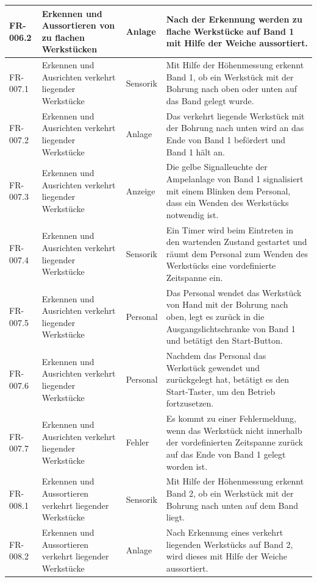\documentclass[oneside,a4paper,titlepage]{scrartcl} %
\begin{document}
\begin{small}
\begin{longtable}{|C{2cm}|L{4cm}|C{1.5cm}|L{5.5cm}|}
  \hline
   FR-006.2 & Erkennen und Aussortieren von zu flachen Werkstücken & Anlage & Nach der Erkennung werden zu flache Werkstücke auf Band 1 mit Hilfe der Weiche aussortiert.\\
  \hline
  FR-007.1 & Erkennen und Ausrichten verkehrt liegender Werkstücke & Sensorik & Mit Hilfe der Höhenmessung erkennt Band 1, ob ein Werkstück mit der Bohrung nach oben oder unten auf das Band gelegt wurde.\\
  \hline
  FR-007.2 & Erkennen und Ausrichten verkehrt liegender Werkstücke & Anlage & Das verkehrt liegende Werkstück mit der Bohrung nach unten wird an das Ende von Band 1 befördert und Band 1 hält an.\\
  \hline
  FR-007.3 & Erkennen und Ausrichten verkehrt liegender Werkstücke & Anzeige & Die gelbe Signalleuchte der Ampelanlage von Band 1 signalisiert mit einem Blinken dem Personal, dass ein Wenden des Werkstücks notwendig ist.\\
  \hline
  FR-007.4 & Erkennen und Ausrichten verkehrt liegender Werkstücke & Sensorik & Ein Timer wird beim Eintreten in den wartenden Zustand gestartet und räumt dem Personal zum Wenden des Werkstücks eine vordefinierte Zeitspanne ein.\\
  \hline
  FR-007.5 & Erkennen und Ausrichten verkehrt liegender Werkstücke & Personal & Das Personal wendet das Werkstück von Hand mit der Bohrung nach oben, legt es zurück in die Ausgangslichtschranke von Band 1 und betätigt den Start-Button.\\
  \hline
  FR-007.6 & Erkennen und Ausrichten verkehrt liegender Werkstücke & Personal & Nachdem das Personal das Werkstück gewendet und zurückgelegt hat, betätigt es den Start-Taster, um den Betrieb fortzusetzen.\\
  \hline
  FR-007.7 & Erkennen und Ausrichten verkehrt liegender Werkstücke & Fehler & Es kommt zu einer Fehlermeldung, wenn das Werkstück nicht innerhalb der vordefinierten Zeitspanne zurück auf das Ende von Band 1 gelegt worden ist.\\
  \hline
   FR-008.1 & Erkennen und Aussortieren verkehrt liegender Werkstücke & Sensorik & Mit Hilfe der Höhenmessung erkennt Band 2, ob ein Werkstück mit der Bohrung nach unten auf dem Band liegt.\\
  \hline
   FR-008.2 & Erkennen und Aussortieren verkehrt liegender Werkstücke & Anlage & Nach Erkennung eines verkehrt liegenden Werkstücks auf Band 2, wird dieses mit Hilfe der Weiche aussortiert.\\

\end{longtable}
\end{small}
\end{document}
